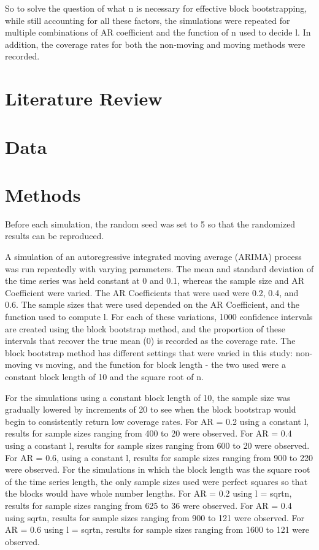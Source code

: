 \documentclass[12pt, letterpaper, titlepage]{article}
\begin{document}
So to solve the question of what n is necessary for effective block bootstrapping,
while still accounting for all these factors, the simulations were repeated for
multiple combinations of AR coefficient and the function of n used to decide l. In 
addition, the coverage rates
for both the non-moving and moving methods were recorded.

\section{Literature Review}
\label{sec:litreview}




\section{Data}
\label{sec:data}




\section{Methods}
\label{sec:methods}

Before each simulation, the random seed was set to 5 so that the randomized results can be 
reproduced. 

A simulation of an autoregressive integrated moving average (ARIMA) process was run 
repeatedly with varying parameters. 
The mean and standard deviation of the time series was held constant at 0 and 0.1, whereas 
the sample size and AR Coefficient
 were varied. The AR Coefficients that were used were 0.2, 0.4, and 0.6. The sample sizes 
 that were used depended on the AR
 Coefficient, and the function used to compute l. For each of these variations, 1000 
 confidence intervals are created using
 the block bootstrap method, and the proportion of these intervals that recover the true 
 mean (0) is recorded as the coverage
 rate. The block bootstrap method has different settings that were varied in this study: 
 non-moving vs moving, 
and the function for block length - the two used were a constant block length of 10 and 
the square root of n.

For the simulations using a constant block length of 10, the sample size was gradually 
lowered by increments of 20 to see when
the block bootstrap would begin to consistently return low coverage rates. For AR = 0.2 
using a constant l, results for
sample sizes ranging from 400 to 20 were observed. For AR = 0.4 using a constant l, 
results for sample sizes ranging from 600
to 20 were observed. For AR = 0.6, using a constant l, results for sample sizes ranging 
from 900 to 220 were observed. For the simulations in which the block length was the 
square root of the time series length, the only sample sizes used were perfect squares so 
that the blocks would have whole number lengths. For AR = 0.2 using l = sqrt{n}, results 
for sample sizes ranging from 625 to 36 were observed. For AR = 0.4 using sqrt{n}, results 
for sample sizes ranging from 900 to 121 were observed. For AR = 0.6 using l = sqrt{n}, 
results for sample sizes ranging from 1600 to 121 were observed. 
\end{document}
